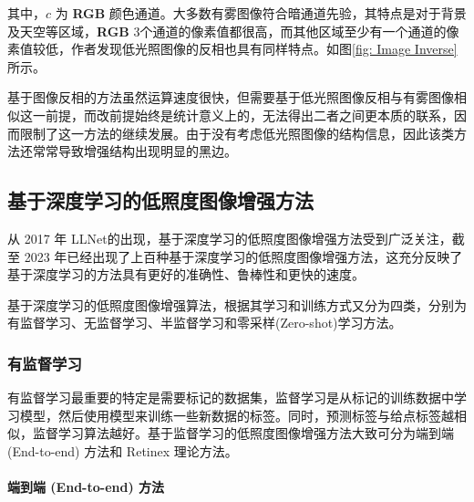 \documentclass[a4paper, 10pt]{article}
\begin{document}
	其中，$c$ 为 \textbf{RGB} 颜色通道。大多数有雾图像符合暗通道先验，其特点是对于背景及天空等区域，\textbf{RGB} 3个通道的像素值都很高，而其他区域至少有一个通道的像素值较低，作者发现低光照图像的反相也具有同样特点。如图\ref{fig: Image Inverse}所示。
	
	基于图像反相的方法虽然运算速度很快，但需要基于低光照图像反相与有雾图像相似这一前提，而改前提始终是统计意义上的，无法得出二者之间更本质的联系，因而限制了这一方法的继续发展。由于没有考虑低光照图像的结构信息，因此该类方法还常常导致增强结构出现明显的黑边。
	
	\subsection{基于深度学习的低照度图像增强方法}
	
	从 2017 年 LLNet\cite{lore2017llnet}的出现，基于深度学习的低照度图像增强方法受到广泛关注，截至 2023 年已经出现了上百种基于深度学习的低照度图像增强方法，这充分反映了基于深度学习的方法具有更好的准确性、鲁棒性和更快的速度。
	
	基于深度学习的低照度图像增强算法，根据其学习和训练方式又分为四类，分别为有监督学习、无监督学习、半监督学习和零采样(Zero-shot)学习方法\cite{tang2023low}。
	
	\subsubsection{有监督学习}
	
	有监督学习最重要的特定是需要标记的数据集，监督学习是从标记的训练数据中学习模型，然后使用模型来训练一些新数据的标签。同时，预测标签与给点标签越相似，监督学习算法越好。基于监督学习的低照度图像增强方法大致可分为端到端 (End-to-end) 方法和 Retinex 理论方法。
	
	\paragraph{端到端 (End-to-end) 方法}
	
\end{document}
